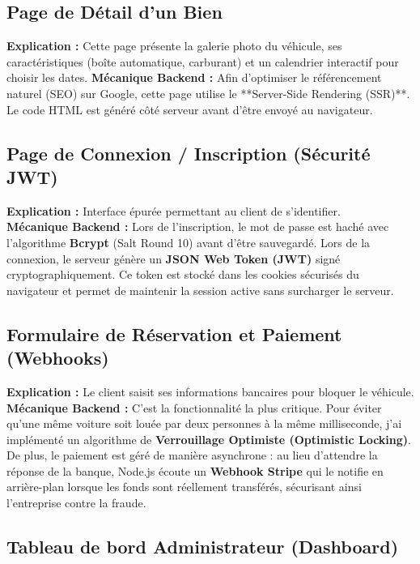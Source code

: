 \subsection{Page de Détail d'un Bien}

\textbf{Explication :} Cette page présente la galerie photo du véhicule, ses caractéristiques (boîte automatique, carburant) et un calendrier interactif pour choisir les dates.
\textbf{Mécanique Backend :} Afin d'optimiser le référencement naturel (SEO) sur Google, cette page utilise le **Server-Side Rendering (SSR)**. Le code HTML est généré côté serveur avant d'être envoyé au navigateur.

\subsection{Page de Connexion / Inscription (Sécurité JWT)}

\textbf{Explication :} Interface épurée permettant au client de s'identifier. \\
\textbf{Mécanique Backend :} Lors de l'inscription, le mot de passe est haché avec l'algorithme \textbf{Bcrypt} (Salt Round 10) avant d'être sauvegardé. Lors de la connexion, le serveur génère un \textbf{JSON Web Token (JWT)} signé cryptographiquement. Ce token est stocké dans les cookies sécurisés du navigateur et permet de maintenir la session active sans surcharger le serveur.

\subsection{Formulaire de Réservation et Paiement (Webhooks)}

\textbf{Explication :} Le client saisit ses informations bancaires pour bloquer le véhicule. \\
\textbf{Mécanique Backend :} C'est la fonctionnalité la plus critique. Pour éviter qu'une même voiture soit louée par deux personnes à la même milliseconde, j'ai implémenté un algorithme de \textbf{Verrouillage Optimiste (Optimistic Locking)}. De plus, le paiement est géré de manière asynchrone : au lieu d'attendre la réponse de la banque, Node.js écoute un \textbf{Webhook Stripe} qui le notifie en arrière-plan lorsque les fonds sont réellement transférés, sécurisant ainsi l'entreprise contre la fraude.

\subsection{Tableau de bord Administrateur (Dashboard)}

